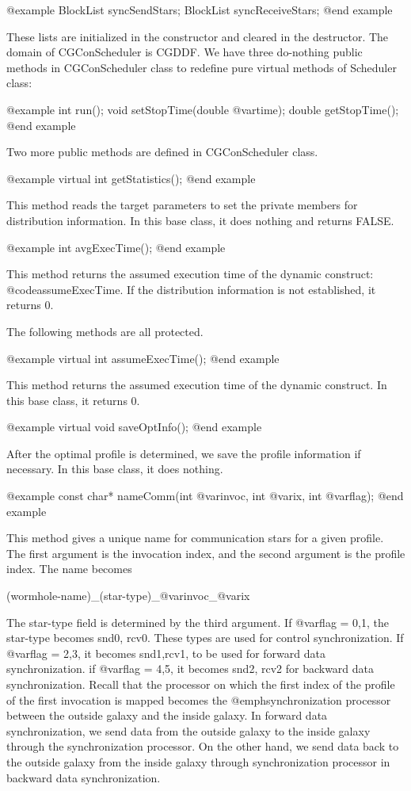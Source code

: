 {@example
BlockList syncSendStars;
BlockList syncReceiveStars;
@end example

These lists are initialized in the constructor and cleared in the destructor.
The domain of CGConScheduler is CGDDF.
We have three do-nothing public methods in CGConScheduler class to redefine
pure virtual methods of Scheduler class:

@example
int run();
void setStopTime(double @var{time});
double getStopTime();
@end example

Two more public methods are defined in CGConScheduler class.

@example
virtual int getStatistics();
@end example

This method reads the target parameters to set the private members for
distribution information. In this base class, it does nothing and returns
FALSE.

@example
int avgExecTime();
@end example

This method returns the assumed execution time of the dynamic construct:
@code{assumeExecTime}.
If the distribution information is not established, it returns 0.

The following methods are all protected.

@example
virtual int assumeExecTime();
@end example

This method returns the assumed execution time of the dynamic construct.
In this base class, it returns 0.

@example
virtual void saveOptInfo();
@end example

After the optimal profile is determined, we save the profile information
if necessary. In this base class, it does nothing.

@example
const char* nameComm(int @var{invoc}, int @var{ix}, int @var{flag});
@end example

This method gives a unique name for communication stars for a given profile.
The first argument is the invocation index, and the second argument is the
profile index. The name becomes

	(wormhole-name)_(star-type)_@var{invoc}_@var{ix}

The star-type field is determined by the third argument. If @var{flag} = 0,1,
the star-type becomes snd0, rcv0. These types are used for control
synchronization. If @var{flag} = 2,3, it becomes snd1,rcv1, to be used for
forward data synchronization. if @var{flag} = 4,5, it becomes snd2, rcv2 for
backward data synchronization. Recall that the processor on which the
first index of the profile of the first invocation is mapped becomes the
@emph{synchronization} processor between the outside galaxy and the inside
galaxy. In forward data synchronization, we send data from the outside
galaxy to the inside galaxy through the synchronization
processor. On the other hand, we send data back to
the outside galaxy from the inside galaxy through synchronization processor in
backward data synchronization.

}
